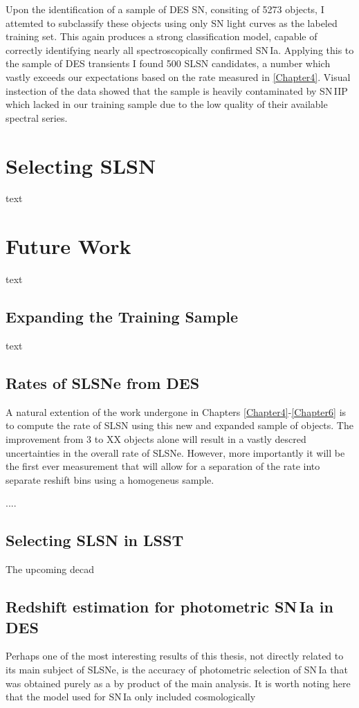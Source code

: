 Upon the identification of a sample of DES SN, consiting of 5273 objects, I attemted to subclassify these objects using only SN light curves as the labeled training set. This again produces a strong classification model, capable of correctly identifying nearly all spectroscopically confirmed SN\,Ia. Applying this to the sample of DES transients I found 500 SLSN candidates, a number which vastly exceeds our expectations based on the rate measured in \cref{Chapter4}. Visual instection of the data showed that the sample is heavily contaminated by SN\,IIP which lacked in our training sample due to the low quality of their available spectral series.

\section{Selecting SLSN}
text

\section{Future Work}
text

\subsection{Expanding the Training Sample}
text

\subsection{Rates of SLSNe from DES}
A natural extention of the work undergone in Chapters \ref{Chapter4}-\ref{Chapter6} is to compute the rate of SLSN using this new and expanded sample of objects. The improvement from 3 to XX objects alone will result in a vastly descred uncertainties in the overall rate of SLSNe. However, more importantly it will be the first ever measurement that will allow for a separation of the rate into separate reshift bins using a homogeneus sample.

....

\subsection{Selecting SLSN in LSST}
The upcoming decad

\subsection{Redshift estimation for photometric SN\,Ia in DES}
Perhaps one of the most interesting results of this thesis, not directly related to its main subject of SLSNe, is the accuracy of photometric selection of SN\,Ia that was obtained purely as a by product of the main analysis. It is worth noting here that the model used for SN\,Ia only included cosmologically
